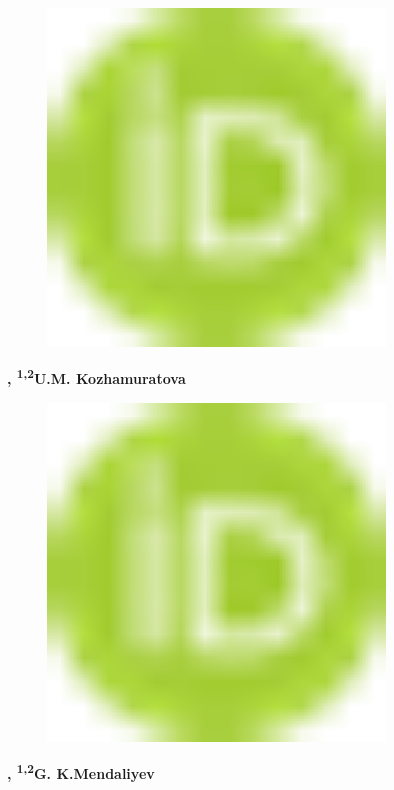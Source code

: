\begin{figure}[H]
	\centering
	\includegraphics[width=0.8\textwidth]{media/chem2/image1}
	\caption*{}
\end{figure}
{\bfseries ,
\textsuperscript{1,2}U.M.
Kozhamuratova}
\begin{figure}[H]
	\centering
	\includegraphics[width=0.8\textwidth]{media/chem2/image1}
	\caption*{}
\end{figure}
{\bfseries ,
\textsuperscript{1,2}G.
K.Mendaliyev}
